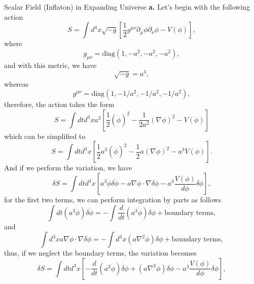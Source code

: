 \documentclass[11pt]{article}
\begin{document}
\newpage
\begin{problem}
Scalar Field (Inflaton) in Expanding Universe
\newline
\textbf{a.} Let's begin with the following action
\begin{displaymath}
  S = \int d^4x \sqrt{-g}\left[\frac{1}{2} g^{\mu\nu}\partial_\mu\phi\partial_\nu\phi -V(\phi)\right],
\end{displaymath}
where 
\begin{displaymath}
  g_{\mu\nu}=\text{diag}(1,-a^2,-a^2,-a^2),
\end{displaymath}
and with this metric, we have
\begin{displaymath}
\sqrt{-g}=a^3,
\end{displaymath}
whereas 
\begin{displaymath}
  g^{\mu\nu} = \text{diag}(1,-1/a^2,-1/a^2,-1/a^2),
\end{displaymath}
therefore, the action takes the form
\begin{displaymath}
S = \int dt d^3x a^3\left[\frac{1}{2}(\dot\phi)^2 - \frac{1}{2a^2}(\nabla\phi)^2-V(\phi) \right]
\end{displaymath}
which can be simplified to
\begin{displaymath}
S = \int dt d^3x \left[\frac{1}{2}a^3(\dot\phi)^2 - \frac{1}{2}a(\nabla\phi)^2- a^3V(\phi) \right].
\end{displaymath}
And if we perform the variation, we have
\begin{displaymath}
  \delta S = \int dt d^3x \left[a^3\dot\phi\delta\dot\phi - a\nabla\phi\cdot\nabla\delta\phi - a^3 \frac{V(\phi)}{d\phi}\delta\phi \right],
\end{displaymath}
for the first two terms, we can perform integration by parts as follows
\begin{displaymath}
\int dt(a^3 \dot\phi)\delta\dot\phi = -\int\frac{d}{dt}\left(a^3\dot\phi\right)\delta\phi + \text{boundary terms},
\end{displaymath}
and 
\begin{displaymath}
\int d^3x a\nabla\phi\cdot\nabla\delta\phi = -\int d^3x (a\nabla^2\phi)\delta\phi + \text{boundary terms},
\end{displaymath}
thus, if we neglect the boundary terms, the variation becomes
\begin{displaymath}
  \delta S = \int dt d^3x\left[-\frac{d}{dt}\left(a^3\dot\phi\right)\delta\phi + (a\nabla^2\phi)\delta\phi - a^3 \frac{V(\phi)}{d\phi}\delta\phi\right],

\end{displaymath}
\end{problem}
\end{document}
